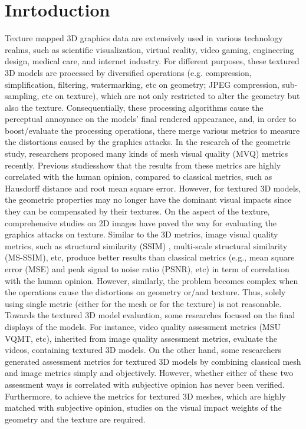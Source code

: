 \section{Inrtoduction}
Texture mapped 3D graphics data are extensively used in various technology realms, such as scientific visualization, virtual reality, video gaming, engineering design, medical care, and internet industry. For different purposes, these textured 3D models are processed by diversified operations (e.g. compression, simplification, filtering, watermarking, etc on geometry; JPEG compression, sub-sampling, etc on texture), which are not only restricted to alter the geometry but also the texture. Consequentially, these processing algorithms cause the perceptual annoyance on the models’ final rendered appearance, and, in order to boost/evaluate the processing operations, there merge various metrics to measure the distortions caused by the graphics attacks. In the research of the geometric study, researchers\cite{Lavou__2011}\cite{V_a_2012}\cite{Wang_2011} proposed many kinds of mesh visual quality (MVQ) metrics recently. Previous studies\cite{Corsini_2013}\cite{Guo_2015}show that the results from these metrics are highly correlated with the human opinion, compared to classical metrics, such as Hausdorff distance and root mean square error. However, for textured 3D models, the geometric properties may no longer have the dominant visual impacts since they can be compensated by their textures.  On the aspect of the texture, comprehensive studies on 2D images have paved the way for evaluating the graphics attacks on texture.  Similar to the 3D metrics, image visual quality metrics, such as structural similarity (SSIM) \cite{Wang_2004}, multi-scale structural similarity (MS-SSIM)\cite{Zhou_Wang_2011}, etc, produce better results than classical metrics (e.g., mean square error (MSE) and peak signal to noise ratio (PSNR), etc) in term of correlation with the human opinion. However, similarly, the problem becomes complex when the operations cause the distortions on geometry or/and texture. Thus, solely using single metric (either for the mesh or for the texture) is not reasonable. Towards the textured 3D model evaluation, some researches focused on the final displays of the models. For instance, video quality assessment metrics (MSU VQMT, etc), inherited from image quality assessment metrics\cite{Wang_2006}, evaluate the videos, containing textured 3D models.  On the other hand, some researchers\cite{Tian_2004} generated assessment metrics for textured 3D models by combining classical mesh and image metrics simply and objectively. However, whether either of these two assessment ways is correlated with subjective opinion has never been verified. Furthermore, to achieve the metrics for textured 3D meshes, which are highly matched with subjective opinion, studies on the visual impact weights of the geometry and the texture are required.\\
